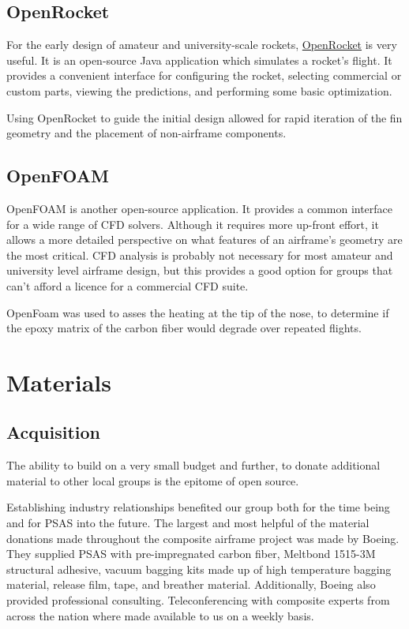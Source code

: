 \documentclass{aiaa-tc}%
\begin{document}
\subsection{OpenRocket}
For the early design of amateur and university-scale rockets, \href{http://openrocket.sourceforge.net/}{OpenRocket} is very useful. 
It is an open-source Java application which simulates a rocket's flight. It provides a convenient interface for configuring the rocket, selecting commercial or custom parts, viewing the predictions, and performing some basic optimization. 

Using OpenRocket to guide the initial design allowed for rapid iteration of the fin geometry and the placement of non-airframe components. 

\subsection{OpenFOAM}
OpenFOAM is another open-source application. It provides a common interface for a wide range of CFD solvers.
Although it requires more up-front effort, it allows a more detailed perspective on what features of an airframe's geometry are the most critical. 
CFD analysis is probably not necessary for most amateur and university level airframe design, but this provides a good option for groups that can't afford a licence for a commercial CFD suite. 

OpenFoam was used to asses the heating at the tip of the nose, to determine if the epoxy matrix of the carbon fiber would degrade over repeated flights.


\section{Materials}

\subsection{Acquisition}
The ability to build on a very small budget and further, to donate additional material to other local groups is the epitome of open source. 

Establishing industry relationships benefited our group both for the time being and for PSAS into the future. The largest and most helpful of the material donations made throughout the composite airframe project was made by Boeing. They supplied PSAS with pre-impregnated carbon fiber, Meltbond 1515-3M structural adhesive, vacuum bagging kits made up of high temperature bagging material, release film, tape, and breather material. Additionally, Boeing also provided professional consulting. Teleconferencing with composite experts from across the nation where made available to us on a weekly basis.  
\end{document}
